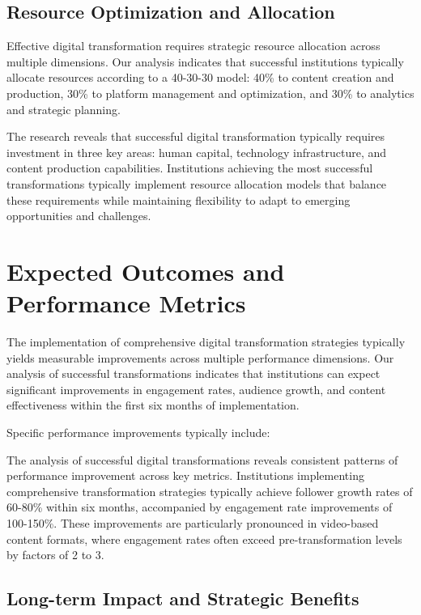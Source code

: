 \documentclass[12pt]{report}
\begin{document}
\section{Resource Optimization and Allocation}

Effective digital transformation requires strategic resource allocation across multiple dimensions. Our analysis indicates that successful institutions typically allocate resources according to a 40-30-30 model: 40\% to content creation and production, 30\% to platform management and optimization, and 30\% to analytics and strategic planning.

The research reveals that successful digital transformation typically requires investment in three key areas: human capital, technology infrastructure, and content production capabilities. Institutions achieving the most successful transformations typically implement resource allocation models that balance these requirements while maintaining flexibility to adapt to emerging opportunities and challenges.

\chapter{Expected Outcomes and Performance Metrics}

The implementation of comprehensive digital transformation strategies typically yields measurable improvements across multiple performance dimensions. Our analysis of successful transformations indicates that institutions can expect significant improvements in engagement rates, audience growth, and content effectiveness within the first six months of implementation.

Specific performance improvements typically include:

The analysis of successful digital transformations reveals consistent patterns of performance improvement across key metrics. Institutions implementing comprehensive transformation strategies typically achieve follower growth rates of 60-80\% within six months, accompanied by engagement rate improvements of 100-150\%. These improvements are particularly pronounced in video-based content formats, where engagement rates often exceed pre-transformation levels by factors of 2 to 3.

\section{Long-term Impact and Strategic Benefits}
\end{document}
